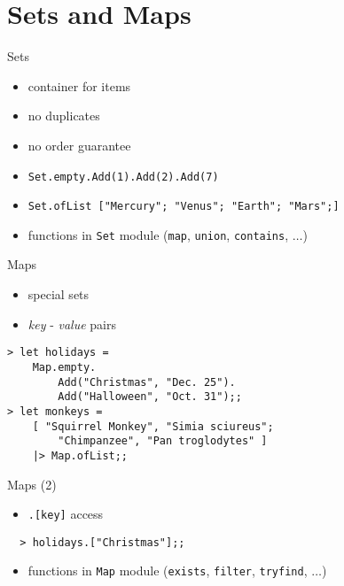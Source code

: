 \documentclass{beamer}
\begin{document}
\section{Sets and Maps}
\frame{\tableofcontents[currentsection]}

\begin{frame}{Sets}
  \begin{itemize}[<+->]
    \item container for items
    \item no duplicates
    \item no order guarantee
    \item \texttt{Set.empty.Add(1).Add(2).Add(7)}
    \item \texttt{Set.ofList ["Mercury"; "Venus"; "Earth"; "Mars";]}
    \item functions in \texttt{Set} module (\texttt{map}, \texttt{union},
    \texttt{contains}, $\ldots$)
  \end{itemize}
\end{frame}

\begin{frame}[fragile]{Maps}
  \begin{itemize}[<+->]
    \item special sets
    \item \textit{key} - \textit{value} pairs
  \end{itemize}
  \pause
  \begin{verbatim}
> let holidays =
    Map.empty.
        Add("Christmas", "Dec. 25").
        Add("Halloween", "Oct. 31");;
> let monkeys = 
    [ "Squirrel Monkey", "Simia sciureus";
        "Chimpanzee", "Pan troglodytes" ]
    |> Map.ofList;;
  \end{verbatim}
\end{frame}

\begin{frame}[fragile]{Maps (2)}
  \begin{itemize}[<+->]
    \item \texttt{.[key]} access
  \end{itemize}
  \begin{verbatim}
  > holidays.["Christmas"];;
  \end{verbatim}
  \pause
  \begin{itemize}
    \item functions in \texttt{Map} module (\texttt{exists}, \texttt{filter},
    \texttt{tryfind}, $\ldots$)
  \end{itemize}
\end{frame}
\end{document}
